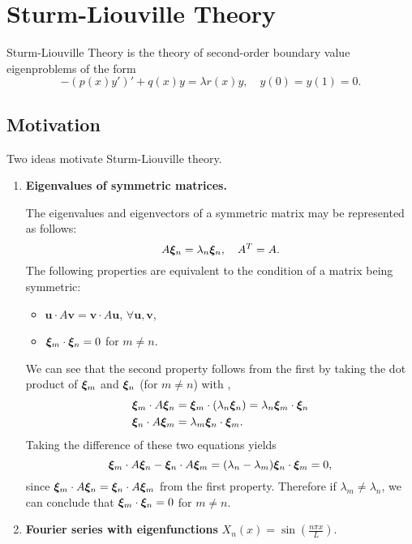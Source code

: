 \section{Sturm-Liouville Theory}

Sturm-Liouville Theory is the theory of second-order boundary value eigenproblems of the form
\begin{equation}
	-\left(p(x)y'\right)' + q(x)y = \lambda r(x)y, \quad y(0)=y(1)=0.
\end{equation}

\subsection{Motivation}

Two ideas motivate Sturm-Liouville theory.

\begin{enumerate}
	\item \textbf{Eigenvalues of symmetric matrices.}
	
	The eigenvalues and eigenvectors of a symmetric matrix may be represented as follows:
	\begin{equation}\label{eq:sleigs}
		A\bm{\xi}_n = \lambda_n\bm{\xi}_n, \quad A^T = A.
	\end{equation}
	The following properties are equivalent to the condition of a matrix being symmetric:
	\begin{itemize}
		\item $\bm{u} \cdot A\bm{v} = \bm{v} \cdot A\bm{u}$, $\forall \bm{u},\bm{v}$,
		\item $\bm{\xi}_m\cdot\bm{\xi}_n = 0$ for $m \neq n$.
	\end{itemize}
	We can see that the second property follows from the first by taking the dot product of $\bm{\xi}_m$ and $\bm{\xi}_n$ (for $m\neq n$) with ,
	\begin{align*}
		\bm{\xi}_m\cdot A\bm{\xi}_n &= \bm{\xi}_m\cdot(\lambda_n\bm{\xi}_n) = \lambda_n \bm{\xi}_m\cdot\bm{\xi}_n \\
		\bm{\xi}_n\cdot A\bm{\xi}_m &= \lambda_m \bm{\xi}_n\cdot\bm{\xi}_m.
	\end{align*}
	Taking the difference of these two equations yields
	\[
	\bm{\xi}_m\cdot A\bm{\xi}_n - \bm{\xi}_n\cdot A\bm{\xi}_m = (\lambda_n - \lambda_m)\bm{\xi}_n\cdot\bm{\xi}_m = 0,
	\]
	since $\bm{\xi}_m\cdot A\bm{\xi}_n = \bm{\xi}_n\cdot A\bm{\xi}_m$ from the first property. Therefore if $\lambda_m \neq \lambda_n$, we can conclude that $\bm{\xi}_m\cdot\bm{\xi}_n = 0$ for $m \neq n$.
	
	\item \textbf{Fourier series with eigenfunctions} $X_n(x) = \sin\left(\frac{n\pi x}{L}\right)$.
	

\end{enumerate}
